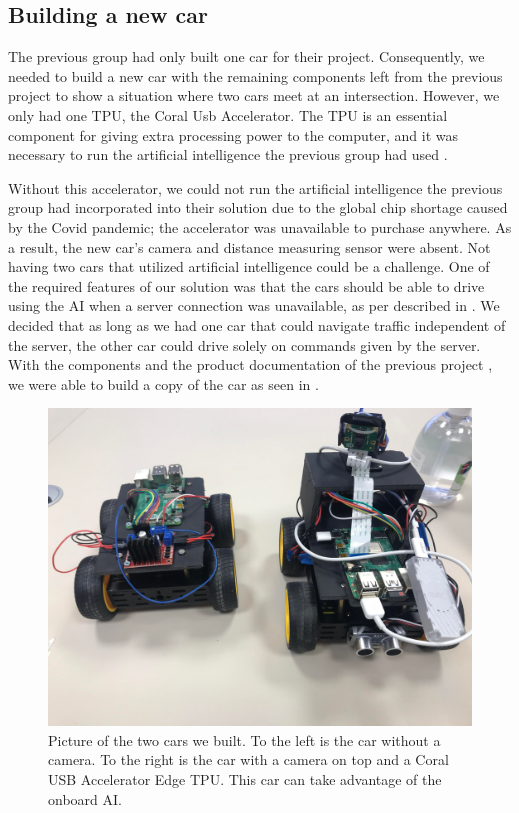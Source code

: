 \subsection{Building a new car}
The previous group had only built one car for their project. Consequently, we needed to build a new car with the remaining components left from the previous project to show a situation where two cars meet at an intersection. However, we only had one TPU, the Coral Usb Accelerator. The TPU is an essential component for giving extra processing power to the computer, and it was necessary to run the artificial intelligence the previous group had used \parencite{prev_project}. 

Without this accelerator, we could not run the artificial intelligence the previous group had incorporated into their solution due to the global chip shortage caused by the Covid pandemic; the accelerator was unavailable to purchase anywhere. As a result, the new car's camera and distance measuring sensor were absent. Not having two cars that utilized artificial intelligence could be a challenge. One of the required features of our solution was that the cars should be able to drive using the AI when a server connection was unavailable, as per described in . We decided that as long as we had one car that could navigate traffic independent of the server, the other car could drive solely on commands given by the server. With the components and the product documentation of the previous project , we were able to build a copy of the car as seen in .

\begin{figure}[h!]
	\centering
	\includegraphics[width=0.9\linewidth]{figures/two_cars}
	\caption{Picture of the two cars we built. To the left is the car without a camera. To the right is the car with a camera on top and a Coral USB Accelerator Edge TPU. This car can take advantage of the onboard AI.}
	\label{fig:twocars}
\end{figure}



